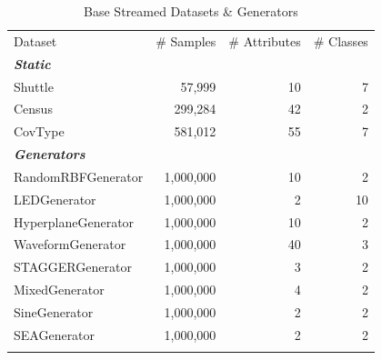 \documentclass[reqno]{vcuthesis}
\numberwithin{equation}{chapter}
\begin{document}
\begin{table}[b!]
\caption{Base Streamed Datasets \& Generators}
\footnotesize
\centering
\label{tab:dsDataset}
\begin{tabularx}{0.9\textwidth}{l@{\extracolsep{\fill}}rrr}
\hline\noalign{\smallskip}
Dataset & \# Samples & \# Attributes & \# Classes \\
\noalign{\smallskip}\hline\noalign{\smallskip}
\textbf{\textit{Static}} 		&				&				& 		\\
Shuttle 						&    57,999		&   10 			& 	7 \\
Census							&   299,284     &  	42			& 	2 \\
CovType		 					&   581,012     & 	55			& 	7 \\
\textbf{\textit{Generators}} 	&				&				& 		\\
RandomRBFGenerator 	       	 	& 	1,000,000	& 	10	        & 	2 \\ %
LEDGenerator	 	       	 	& 	1,000,000	& 	2	        & 	10 \\ %
HyperplaneGenerator 	        & 	1,000,000	& 	10	        & 	2 \\ %
WaveformGenerator 	       	 	& 	1,000,000	& 	40	        & 	3 \\ %
STAGGERGenerator 	 			& 	1,000,000	& 	3	        & 	2 \\ %
MixedGenerator 					& 	1,000,000	& 	4	        & 	2 \\%
SineGenerator 					& 	1,000,000	& 	2	        & 	2 \\%
SEAGenerator	       			& 	1,000,000	& 	2	        & 	2 \\ %
\noalign{\smallskip}\hline
\end{tabularx}
\end{table}
\end{document}
